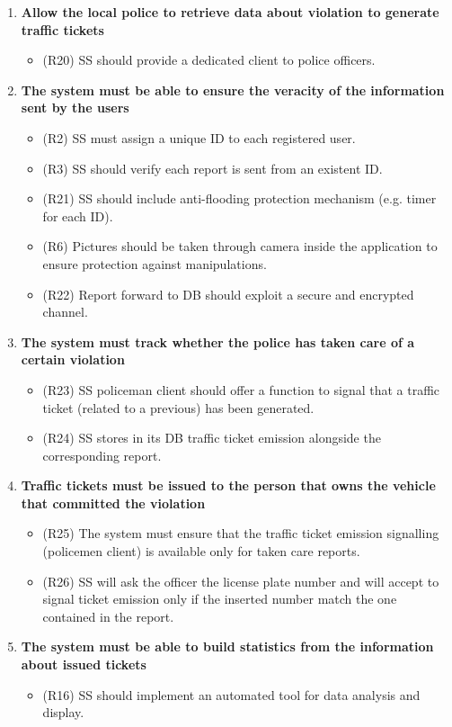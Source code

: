 \begin{enumerate} [label = GA 2.\arabic* - ]
	
\item \textbf{Allow the local police to retrieve data about violation to generate traffic tickets}
	\begin{itemize}
	\item (R20) SS should provide a dedicated client to police officers.
	\end{itemize}
	\bigskip
	
\item \textbf{The system must be able to ensure the veracity of the information sent by the users}
	\begin{itemize}
	\item (R2) SS must assign a unique ID to each registered user.
	\item (R3) SS should verify each report is sent from an existent ID.
	\item (R21) SS should include anti-flooding protection mechanism (e.g. timer for each ID).
	\item (R6) Pictures should be taken through camera inside the application to ensure protection against manipulations.
	\item (R22) Report forward to DB should exploit a secure and encrypted channel.
	\end{itemize}
	\bigskip

\item \textbf{The system must track whether the police has taken care of a certain violation}
	\begin{itemize}
	\item(R23) SS policeman client should offer a function to signal that a traffic ticket (related to a previous) has been generated.
	\item(R24) SS stores in its DB traffic ticket emission alongside the corresponding report.
	\end{itemize}
	\bigskip
	
\item \textbf{Traffic tickets must be issued to the person that owns the vehicle that committed the violation}
	\begin{itemize}
	\item(R25) The system must ensure that the traffic ticket emission signalling (policemen client) is available only for taken care reports.
	\item(R26) SS will ask the officer the license plate number and will accept to signal ticket emission only if the inserted number match the one contained in the report.
	\end{itemize}
	\bigskip
	
\item \textbf{The system must be able to build statistics from the information about issued tickets}
	\begin{itemize}
	\item(R16) SS should implement an automated tool for data analysis and display.
	\end{itemize}
	\bigskip
	
	\end{enumerate}

